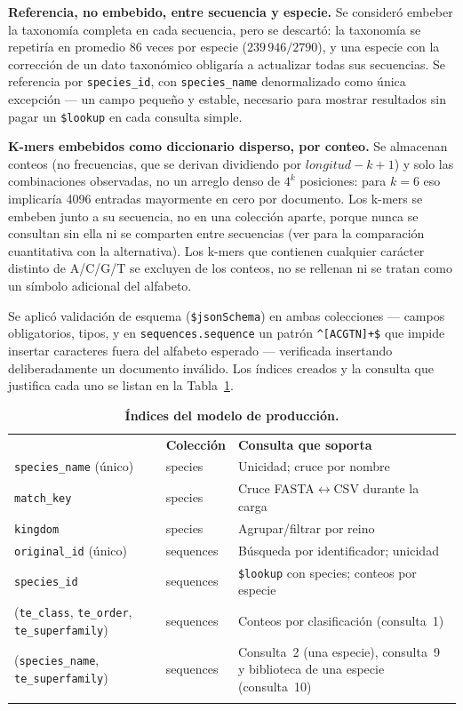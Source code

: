 \documentclass[pdflatex,sn-vancouver-num,lineno,referee]{sn-jnl}
\newcommand\cab[1]{{\color{white}\bfseries #1}}%
\newcommand\filasalternas{\rowcolors{2}{}{teClaro}}%
\begin{document}
\textbf{Referencia, no embebido, entre secuencia y especie.} Se consideró
embeber la taxonomía completa en cada secuencia, pero se descartó: la
taxonomía se repetiría en promedio 86 veces por especie
($239\,946/2790$), y una especie con la corrección de un dato taxonómico
obligaría a actualizar todas sus secuencias. Se referencia por
\texttt{species\_id}, con \texttt{species\_name} denormalizado como única
excepción --- un campo pequeño y estable, necesario para mostrar resultados sin
pagar un \texttt{\$lookup} en cada consulta simple.

\textbf{K-mers embebidos como diccionario disperso, por conteo.} Se almacenan
conteos (no frecuencias, que se derivan dividiendo por $longitud-k+1$) y solo
las combinaciones observadas, no un arreglo denso de $4^k$ posiciones: para
$k=6$ eso implicaría 4096 entradas mayormente en cero por documento. Los
k-mers se embeben junto a su secuencia, no en una colección aparte, porque
nunca se consultan sin ella ni se comparten entre secuencias (ver
 para la comparación cuantitativa con la alternativa).
Los k-mers que contienen cualquier carácter distinto de A/C/G/T se excluyen de
los conteos, no se rellenan ni se tratan como un símbolo adicional del
alfabeto.

Se aplicó validación de esquema (\texttt{\$jsonSchema}) en ambas colecciones
--- campos obligatorios, tipos, y en \texttt{sequences.sequence} un patrón
\texttt{\^{}[ACGTN]+\$} que impide insertar caracteres fuera del alfabeto
esperado --- verificada insertando deliberadamente un documento inválido. Los
índices creados y la consulta que justifica cada uno se listan en la
Tabla~\ref{tab:indices}.

\begin{table}[!ht]
\caption{\textbf{Índices del modelo de producción.}}
\filasalternas
\begin{tabular}{@{}p{3.6cm}p{2.0cm}p{6.3cm}@{}}
\rowcolor{teOscuro}\cab{Índice} & \cab{Colección} & \cab{Consulta que soporta} \\
\texttt{species\_name} (único) & species & Unicidad; cruce por nombre \\
\texttt{match\_key} & species & Cruce FASTA$\leftrightarrow$CSV durante la carga \\
\texttt{kingdom} & species & Agrupar/filtrar por reino \\
\texttt{original\_id} (único) & sequences & Búsqueda por identificador; unicidad \\
\texttt{species\_id} & sequences & \texttt{\$lookup} con species; conteos por especie \\
(\texttt{te\_class}, \texttt{te\_order}, \texttt{te\_superfamily}) & sequences & Conteos por clasificación (consulta~1) \\
(\texttt{species\_name}, \texttt{te\_superfamily}) & sequences & Consulta~2 (una especie), consulta~9 y biblioteca de una especie (consulta~10) \\
\botrule
\end{tabular}
\label{tab:indices}
\end{table}
\end{document}
